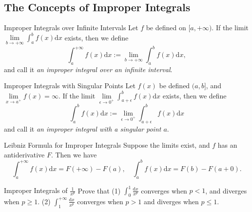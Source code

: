 \subsection{The Concepts of Improper Integrals}

\begin{definition}{Improper Integrals over Infinite Intervals}{}
  Let $f$ be defined on $[a, +\infty)$.
  If the limit $\lim \limits _{b \rightarrow +\infty} \int_a^b f(x)\mathrm{d} x$
  exists,
  then we define
  \begin{equation}
    \int_a^{+\infty} f(x) \mathrm{d} x := \lim \limits _{b \rightarrow +\infty} \int_a^b f(x)\mathrm{d} x,
  \end{equation}
  and call it \emph{an improper integral over an infinite interval}.
\end{definition}

\begin{definition}{Improper Integrals with Singular Points}{}
  Let $f(x)$ be defined $(a, b]$,
  and $\lim \limits _{x \rightarrow a^+}f(x) = \infty$.
  If the limit $\lim \limits _{\epsilon \rightarrow 0^+} \int_{a+\epsilon}^b
  f(x) \mathrm{d} x$ exists,
  then we define
  \begin{equation}
    \int_a^b f(x) \mathrm{d} x := \lim \limits _{\epsilon \rightarrow 0^+} \int_{a+\epsilon}^b
  f(x) \mathrm{d} x
  \end{equation}
  and call it \emph{an improper integral with a singular point $a$}.
\end{definition}

\begin{theorem}{Leibniz Formula for Improper Integrals}{}
  Suppose the limits exist, and $f$ has an antiderivative $F$.
  Then we have
  \begin{equation}
    \int_a^{+\infty} f(x) \mathrm{d} x = F(+\infty) - F(a), \quad
    \int_a^b f(x) \mathrm{d} x = F(b) - F(a+0).
  \end{equation}
\end{theorem}

\begin{example}{Improper Integrals of $\frac{1}{x^p}$}{}
  Prove that (1) $\int_0^1 \frac{\mathrm{d} x}{x^p}$ converges when $p < 1$,
  and diverges when $p \geq 1$.
  (2) $\int_1^{+\infty} \frac{\mathrm{d}x}{x^p}$ converges when $p > 1$
  and diverges when $p \leq 1$.
\end{example}

